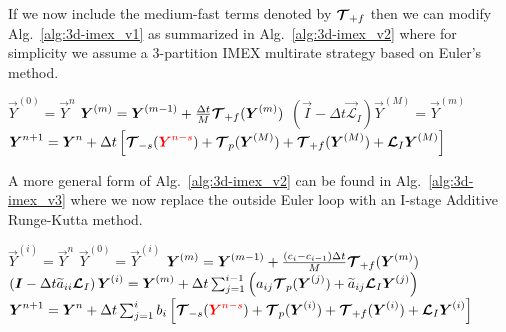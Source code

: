 \documentclass{report}
\begin{document}
{If we now include the medium-fast terms denoted by $\boldsymbol{{\mathcal{T}}}_{+f}$ then we can modify Alg.\ \ref{alg:3d-imex_v1} as summarized in Alg.\ \ref{alg:3d-imex_v2} where for simplicity we assume a 3-partition IMEX multirate strategy based on Euler's method.
\begin{algorithm}
\label{alg:3d-imex_v2}
\begin{algorithmic}
\State
{}
\State $\vec{Y}^{(0)}=\vec{Y}^{n}$
\State $\boldsymbol{{Y}}^{(m)}=\boldsymbol{{Y}}^{(m-1)} + \frac{\Delta t}{M} \boldsymbol{{\mathcal{T}}}_{+f}(\boldsymbol{{Y}}^{(m)})$
\EndFor %
\State $\left( \vec{I} - \Delta t \vec{\mathcal{L}}_I \right) \vec{Y}^{(M)}=\vec{Y}^{(m)}$
\State $\boldsymbol{{Y}}^{n+1}=\boldsymbol{{Y}}^{n} + \Delta t \left[ \boldsymbol{{\mathcal{T}}}_{-s}(\textcolor{red}{\boldsymbol{{Y}}^{n-s}}) + \boldsymbol{{\mathcal{T}}}_{p}(\boldsymbol{{Y}}^{(M)}) + 
\boldsymbol{{\mathcal{T}}}_{+f}(\boldsymbol{{Y}}^{(M)}) + 
\boldsymbol{{\mathcal{L}}}_I \boldsymbol{{Y}}^{(M)} \right]$
\EndFunction
\end{algorithmic}
\end{algorithm}
A more general form of Alg.\ \ref{alg:3d-imex_v2} can be found in Alg.\ \ref{alg:3d-imex_v3} where we now replace the outside Euler loop with an I-stage Additive Runge-Kutta method. 
\begin{algorithm}
\label{alg:3d-imex_v3}
\begin{algorithmic}
\State
{}
\State $\vec{Y}^{(i)}=\vec{Y}^{n}$
\State $\vec{Y}^{(0)}=\vec{Y}^{(i)}$
\State $\boldsymbol{{Y}}^{(m)}=\boldsymbol{{Y}}^{(m-1)} + \frac{\left(c_i - c_{i-1} \right) \Delta t}{M} \boldsymbol{{\mathcal{T}}}_{+f}(\boldsymbol{{Y}}^{(m)})$
\EndFor %
\State $\left( \boldsymbol{{I}} - \Delta t \widetilde{a}_{ii} \boldsymbol{{\mathcal{L}}}_I \right) \boldsymbol{{Y}}^{(i)}=\boldsymbol{{Y}}^{(m)} + \Delta t \sum_{j=1}^{i-1} \left( a_{ij} \boldsymbol{{\mathcal{T}}}_{p}(\boldsymbol{{Y}}^{(j)}) + \widetilde{a}_{ij} \boldsymbol{{\mathcal{L}}}_I \boldsymbol{{Y}}^{(j)} \right)$
\EndFor %
\State $\boldsymbol{{Y}}^{n+1}=\boldsymbol{{Y}}^{n} + \Delta t \sum_{j=1}^{i} b_i \left[ \boldsymbol{{\mathcal{T}}}_{-s}(\textcolor{red}{\boldsymbol{{Y}}^{n-s}}) + \boldsymbol{{\mathcal{T}}}_{p}(\boldsymbol{{Y}}^{(i)}) + 
\boldsymbol{{\mathcal{T}}}_{+f}(\boldsymbol{{Y}}^{(i)}) + 
\boldsymbol{{\mathcal{L}}}_I \boldsymbol{{Y}}^{(i)} \right]$
\EndFunction
\end{algorithmic}
\end{algorithm}

}
\end{document}
